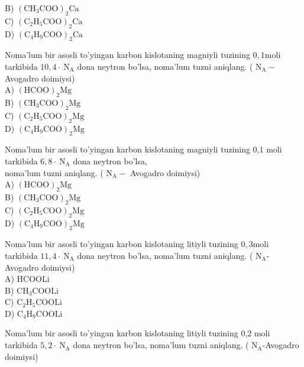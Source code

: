 B) $\left(\mathrm{CH}_{3} \mathrm{COO}\right)_{2} \mathrm{Ca}$\\
C) $\left(\mathrm{C}_{2} \mathrm{H}_{5} \mathrm{COO}\right)_{2} \mathrm{Ca}$\\
D) $\left(\mathrm{C}_{4} \mathrm{H}_{9} \mathrm{COO}\right)_{2} \mathrm{Ca}$
  \item Noma'lum bir asosli to'yingan karbon kislotaning magniyli tuzining $0,1 \mathrm{moli}$ tarkibida $10,4 \cdot \mathrm{~N}_{\mathrm{A}}$ dona neytron bo'lsa, noma'lum tuzni aniqlang. ( $\mathrm{N}_{\mathrm{A}}-$ Avogadro doimiysi)\\
A) $(\mathrm{HCOO})_{2} \mathrm{Mg}$\\
B) $\left(\mathrm{CH}_{3} \mathrm{COO}\right)_{2} \mathrm{Mg}$\\
C) $\left(\mathrm{C}_{2} \mathrm{H}_{5} \mathrm{COO}\right)_{2} \mathrm{Mg}$\\
D) $\left(\mathrm{C}_{4} \mathrm{H}_{9} \mathrm{COO}\right)_{2} \mathrm{Mg}$
  \item Noma'lum bir asosli to'yingan karbon kislotaning magniyli tuzining 0,1 moli tarkibida $6,8 \cdot \mathrm{~N}_{\mathrm{A}}$ dona neytron bo'lsa,\\
noma'lum tuzni aniqlang. ( $\mathrm{N}_{\mathrm{A}}-$ Avogadro doimiysi)\\
A) $(\mathrm{HCOO})_{2} \mathrm{Mg}$\\
B) $\left(\mathrm{CH}_{3} \mathrm{COO}\right)_{2} \mathrm{Mg}$\\
C) $\left(\mathrm{C}_{2} \mathrm{H}_{5} \mathrm{COO}\right)_{2} \mathrm{Mg}$\\
D) $\left(\mathrm{C}_{4} \mathrm{H}_{9} \mathrm{COO}\right)_{2} \mathrm{Mg}$
  \item Noma'lum bir asosli to'yingan karbon kislotaning litiyli tuzining $0,3 \mathrm{moli}$ tarkibida $11,4 \cdot \mathrm{~N}_{\mathrm{A}}$ dona neytron bo'lsa, noma'lum tuzni aniqlang. ( $\mathrm{N}_{\mathrm{A}}$-Avogadro doimiysi)\\
A) HCOOLi\\
B) $\mathrm{CH}_{3} \mathrm{COOLi}$\\
C) $\mathrm{C}_{2} \mathrm{H}_{5} \mathrm{COOLi}$\\
D) $\mathrm{C}_{4} \mathrm{H}_{9} \mathrm{COOLi}$
  \item Noma'lum bir asosli to'yingan karbon kislotaning litiyli tuzining 0,2 moli tarkibida $5,2 \cdot \mathrm{~N}_{\mathrm{A}}$ dona neytron bo'lsa, noma'lum tuzni aniqlang. ( $\mathrm{N}_{\mathrm{A}}$-Avogadro doimiysi)\\
